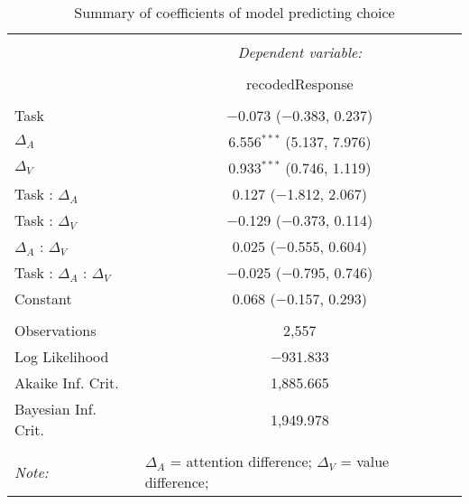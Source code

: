 
\begin{table}[!b] \centering 
  \caption{Summary of coefficients of model predicting choice} 
  \label{table:choiceModel} 
\begin{tabular}{@{\extracolsep{5pt}}lc} 
\\[-1.8ex]\hline 
\hline \\[-1.8ex] 
 & \multicolumn{1}{c}{\textit{Dependent variable:}} \\ 
\cline{2-2} 
\\[-1.8ex] & recodedResponse \\ 
\hline \\[-1.8ex] 
 Task & $-$0.073 ($-$0.383, 0.237) \\ 
  $\Delta_A$ & 6.556$^{***}$ (5.137, 7.976) \\ 
  $\Delta_V$ & 0.933$^{***}$ (0.746, 1.119) \\ 
  Task : $\Delta_A$ & 0.127 ($-$1.812, 2.067) \\ 
  Task : $\Delta_V$ & $-$0.129 ($-$0.373, 0.114) \\ 
  $\Delta_A$ : $\Delta_V$ & 0.025 ($-$0.555, 0.604) \\ 
  Task : $\Delta_A$ :  $\Delta_V$ & $-$0.025 ($-$0.795, 0.746) \\ 
  Constant & 0.068 ($-$0.157, 0.293) \\ 
 \hline \\[-1.8ex] 
Observations & 2,557 \\ 
Log Likelihood & $-$931.833 \\ 
Akaike Inf. Crit. & 1,885.665 \\ 
Bayesian Inf. Crit. & 1,949.978 \\ 
\hline 
\hline \\[-1.8ex] 
\textit{Note:}  & \multicolumn{1}{l}{\footnotesize $\Delta_A$ = attention difference; $\Delta_V$ = value difference; } \\ 
\end{tabular} 
\end{table} 
